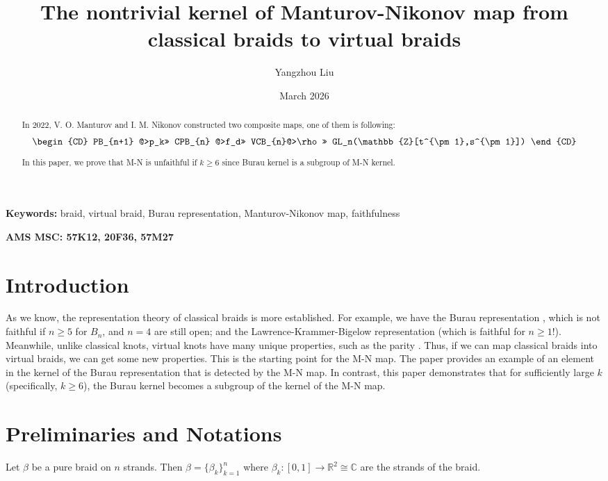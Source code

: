 \documentclass{article}
\title{The nontrivial kernel of Manturov-Nikonov map from classical braids to virtual braids}
\author{Yangzhou Liu}
\date{March 2026}
\begin{document}
\maketitle
\begin{abstract}
In 2022, V. O. Manturov and I. M. Nikonov \cite{Man22} constructed two composite maps, one of them is following:
$$\begin{CD} 
PB_{n+1} @>p_k>> CPB_{n} @>f_d>> VCB_{n}@>\rho>> GL_n(\mathbb{Z}[t^{\pm 1},s^{\pm 1}])
\end{CD}$$

In this paper, we prove that M-N is unfaithful if $k\geq 6$ since Burau kernel is a subgroup of M-N kernel.

\end{abstract}

\textbf{Keywords:} braid, virtual braid, Burau representation, Manturov-Nikonov map, faithfulness

\textbf{AMS MSC: 57K12, 20F36, 57M27} 

\section{Introduction}
As we know, the representation theory of classical braids is more established. For example, we have the Burau representation \cite{Big99}, which is not faithful if $n\geq 5$ for $B_n$, and $n=4$ are still open; and the Lawrence-Krammer-Bigelow representation (which is faithful for $n\geq 1$!\cite{Big02}). Meanwhile, unlike classical knots, virtual knots have many unique properties, such as the parity \cite{Man10}. Thus, if we can map classical braids into virtual braids, we can get some new properties. This is the starting point for the M-N map. The paper \cite{Man22} provides an example of an element in the kernel of the Burau representation that is detected by the M-N map. In contrast, this paper demonstrates that for sufficiently large $k$ (specifically, $k \geq 6$), the Burau kernel becomes a subgroup of the kernel of the M-N map.

\section{Preliminaries and Notations}
Let $\beta$ be a pure braid on $n$ strands. Then $\beta=\{\beta_k\}_{k=1}^n$ where $\beta_k: [0,1]\rightarrow \mathbb{R}^2\cong \mathbb{C}$ are the strands of the braid.
\end{document}
